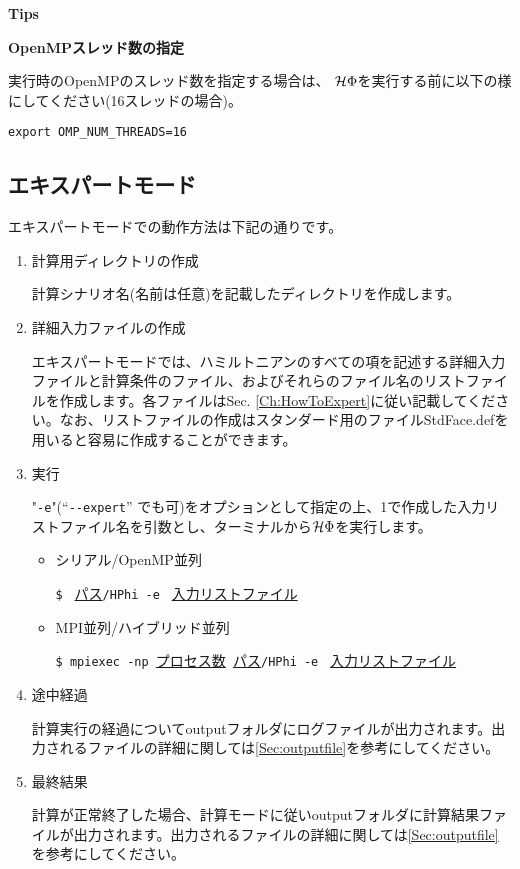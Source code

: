 \begin{screen}
\Large 
{\bf Tips}
\normalsize

{\bf OpenMPスレッド数の指定}

実行時のOpenMPのスレッド数を指定する場合は、
$\mathcal{H} \Phi$を実行する前に以下の様にしてください(16スレッドの場合)。
\begin{verbatim}
export OMP_NUM_THREADS=16
\end{verbatim}

\end{screen}

\newpage
\subsection{エキスパートモード}
エキスパートモードでの動作方法は下記の通りです。

 \begin{enumerate}
   \item  計算用ディレクトリの作成

計算シナリオ名(名前は任意)を記載したディレクトリを作成します。

   \item  詳細入力ファイルの作成

エキスパートモードでは、ハミルトニアンのすべての項を記述する詳細入力ファイルと計算条件のファイル、およびそれらのファイル名のリストファイルを作成します。各ファイルはSec. \ref{Ch:HowToExpert}に従い記載してください。なお、リストファイルの作成はスタンダード用のファイルStdFace.defを用いると容易に作成することができます。

 \item  実行

"\verb|-e|"(``\verb|--expert|'' でも可)をオプションとして指定の上、1で作成した入力リストファイル名を引数とし、ターミナルから$\mathcal{H} \Phi$を実行します。

\begin{itemize}

\item シリアル/OpenMP並列

\verb|$ | \underline{パス}\verb|/HPhi -e | \underline{入力リストファイル} 

\item MPI並列/ハイブリッド並列

\verb|$ mpiexec -np |\underline{プロセス数}\verb| |\underline{パス}\verb|/HPhi -e | \underline{入力リストファイル}

\end{itemize}

\item 途中経過

計算実行の経過についてoutputフォルダにログファイルが出力されます。出力されるファイルの詳細に関しては\ref{Sec:outputfile}を参考にしてください。

\item 最終結果

計算が正常終了した場合、計算モードに従いoutputフォルダに計算結果ファイルが出力されます。出力されるファイルの詳細に関しては\ref{Sec:outputfile}を参考にしてください。
\end{enumerate}
